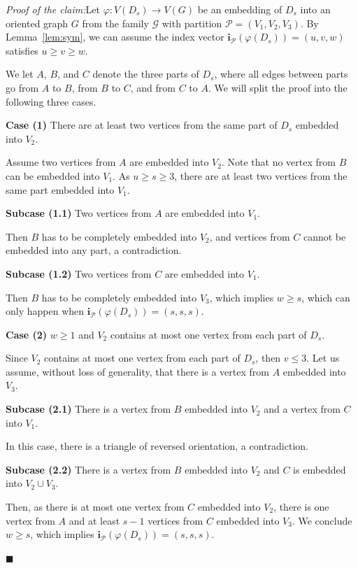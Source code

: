 \documentclass[11pt]{amsart}
\newcommand{\CP}{\mathcal{P}}
\newcommand{\G}{\mathcal{G}}
\newenvironment{claimproof}[1]{\par\noindent\textit{Proof of the claim:}\space#1}{\leavevmode\unskip\penalty9999 \hbox{}\nobreak\hfill\quad\hbox{$\blacksquare$}}
\begin{document}
\begin{claimproof}
    Let $\varphi: V(D_s) \to V(G)$ be an embedding of $D_s$ into an oriented graph $G$ from the family $\G$ with partition $\CP = (V_1,V_2,V_3)$. By Lemma~\ref{lem:sym}, we can assume the index vector $\mathbf{i}_\CP(\varphi(D_s)) = (u,v,w)$ satisfies $u \ge v \ge w$. 

    We let $A$, $B$, and $C$ denote the three parts of $D_s$, where all edges between parts go from $A$ to $B$, from $B$ to $C$, and from $C$ to $A$. We will split the proof into the following three cases. 

    \medskip \noindent \textbf{Case (1)} There are at least two vertices from the same part of $D_s$ embedded into $V_2$. \medskip
    
    Assume two vertices from $A$ are embedded into $V_2$. Note that no vertex from $B$ can be embedded into $V_1$. As $u \ge s \ge 3$, there are at least two vertices from the same part embedded into $V_1$.

    \medskip \textbf{Subcase (1.1) } Two vertices from $A$ are embedded into $V_1$. \medskip

    Then $B$ has to be completely embedded into $V_2$, and vertices from $C$ cannot be embedded into any part, a contradiction.

    \medskip \textbf{Subcase (1.2) } Two vertices from $C$ are embedded into $V_1$. \medskip

    Then $B$ has to be completely embedded into $V_3$, which implies $w \ge s$, which can only happen when $\mathbf{i}_\CP(\varphi(D_s))=(s,s,s)$.

    \medskip \noindent  \textbf{Case (2) } $w \ge 1$ and $V_2$ contains at most one vertex from each part of $D_s$. \medskip
    
    Since $V_2$ contains at most one vertex from each part of $D_s$, then $v \le 3$. Let us assume, without loss of generality, that there is a vertex from $A$ embedded into $V_3$.

    \medskip \textbf{Subcase (2.1) } There is a vertex from $B$ embedded into $V_2$ and a vertex from $C$ into $V_1$. \medskip
    
    In this case, there is a triangle of reversed orientation, a contradiction.

    \medskip \textbf{Subcase (2.2) } There is a vertex from $B$ embedded into $V_2$ and $C$ is embedded into $V_2 \cup V_3$. \medskip
    
    Then, as there is at most one vertex from $C$ embedded into $V_2$, there is one vertex from $A$ and at least $s-1$ vertices from $C$ embedded into $V_3$.
    We conclude $w \ge s$, which implies $\mathbf{i}_\CP(\varphi(D_s))=(s,s,s)$.
    

\end{claimproof}
\end{document}

